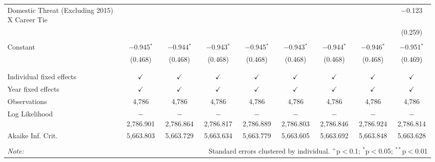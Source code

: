 \begin{table}[!htbp]
\begin{tabular}{@{\extracolsep{5pt}}lcccccccc}
 Domestic Threat (Excluding 2015) X Career Tie &  &  &  &  &  &  &  & $-$0.123 \\ 
  &  &  &  &  &  &  &  & (0.259) \\ 
  & & & & & & & & \\ 
 Constant & $-$0.945$^{*}$ & $-$0.944$^{*}$ & $-$0.943$^{*}$ & $-$0.945$^{*}$ & $-$0.943$^{*}$ & $-$0.944$^{*}$ & $-$0.946$^{*}$ & $-$0.951$^{*}$ \\ 
  & (0.468) & (0.468) & (0.468) & (0.468) & (0.468) & (0.468) & (0.468) & (0.469) \\ 
  & & & & & & & & \\ 
\hline \\[-1.8ex] 
Individual fixed effects & $\checkmark$ & $\checkmark$ & $\checkmark$ & $\checkmark$ & $\checkmark$ & $\checkmark$ & $\checkmark$ & $\checkmark$ \\ 
Year fixed effects & $\checkmark$ & $\checkmark$ & $\checkmark$ & $\checkmark$ & $\checkmark$ & $\checkmark$ & $\checkmark$ & $\checkmark$ \\ 
Observations & 4,786 & 4,786 & 4,786 & 4,786 & 4,786 & 4,786 & 4,786 & 4,786 \\ 
Log Likelihood & $-$2,786.901 & $-$2,786.864 & $-$2,786.817 & $-$2,786.889 & $-$2,786.803 & $-$2,786.846 & $-$2,786.924 & $-$2,786.814 \\ 
Akaike Inf. Crit. & 5,663.803 & 5,663.729 & 5,663.634 & 5,663.779 & 5,663.605 & 5,663.692 & 5,663.848 & 5,663.628 \\ 
\hline 
\hline \\[-1.8ex] 
\textit{Note:}  & \multicolumn{8}{r}{Standard errors clustered by individual. $^{+}$p$<$0.1; $^{*}$p$<$0.05; $^{**}$p$<$0.01}} \\ 
\end{tabular} 
\end{table} 
